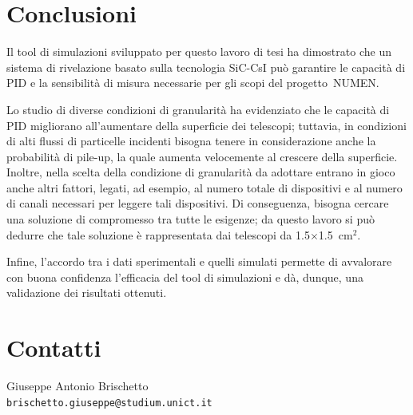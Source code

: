 \documentclass[10pt,foldmark,notumble]{leaflet}
\begin{document}
\section{Conclusioni}


Il tool di simulazioni sviluppato per questo lavoro di tesi ha dimostrato che un sistema di rivelazione basato sulla tecnologia SiC-CsI può garantire le capacità di PID e la sensibilità di misura necessarie per gli scopi del progetto~NUMEN.

Lo studio di diverse condizioni di granularità ha evidenziato che le capacità di PID migliorano all'aumentare della superficie dei telescopi; tuttavia, in condizioni di alti flussi di particelle incidenti bisogna tenere in considerazione anche la probabilità di pile-up, la quale aumenta velocemente al crescere della superficie.
Inoltre, nella scelta della condizione di granularità da adottare entrano in gioco anche altri fattori, legati, ad esempio, al numero totale di dispositivi e al numero di canali necessari per leggere tali dispositivi.
Di conseguenza, bisogna cercare una soluzione di compromesso tra tutte le esigenze; da questo lavoro si può dedurre che tale soluzione è rappresentata dai telescopi da 1.5$\times$1.5~$\mbox{cm}^2$.


Infine, l'accordo tra i dati sperimentali e quelli simulati permette di avvalorare con buona confidenza l'efficacia del tool di simulazioni e dà, dunque, una validazione dei risultati ottenuti.













\section{Contatti}

Giuseppe Antonio Brischetto\\ {\tt brischetto.giuseppe@studium.unict.it}
\end{document}
